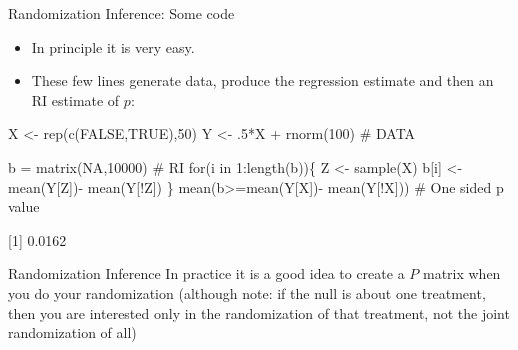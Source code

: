 \documentclass[
  11pt,
  ignorenonframetext,
]{beamer}
\newenvironment{Shaded}{\begin{snugshade}}{\end{snugshade}}
\newcommand{\CommentTok}[1]{\textcolor[rgb]{0.37,0.37,0.37}{#1}}
\newcommand{\ConstantTok}[1]{\textcolor[rgb]{0.56,0.35,0.01}{#1}}
\newcommand{\ControlFlowTok}[1]{\textcolor[rgb]{0.00,0.23,0.31}{#1}}
\newcommand{\DecValTok}[1]{\textcolor[rgb]{0.68,0.00,0.00}{#1}}
\newcommand{\FunctionTok}[1]{\textcolor[rgb]{0.28,0.35,0.67}{#1}}
\newcommand{\NormalTok}[1]{\textcolor[rgb]{0.00,0.23,0.31}{#1}}
\newcommand{\OtherTok}[1]{\textcolor[rgb]{0.00,0.23,0.31}{#1}}
\newcommand{\SpecialCharTok}[1]{\textcolor[rgb]{0.37,0.37,0.37}{#1}}
\providecommand{\tightlist}{%
  \setlength{\itemsep}{0pt}\setlength{\parskip}{0pt}}\usepackage{longtable,booktabs,array}
\begin{document}
\begin{frame}[fragile]{Randomization Inference: Some code}
\protect\hypertarget{randomization-inference-some-code}{}
\begin{itemize}
\tightlist
\item
  In principle it is very easy.
\item
  These few lines generate data, produce the regression estimate and
  then an RI estimate of \(p\):
\end{itemize}

\begin{Shaded}
\begin{Highlighting}[]
\NormalTok{X }\OtherTok{\textless{}{-}} \FunctionTok{rep}\NormalTok{(}\FunctionTok{c}\NormalTok{(}\ConstantTok{FALSE}\NormalTok{,}\ConstantTok{TRUE}\NormalTok{),}\DecValTok{50}\NormalTok{)}
\NormalTok{Y }\OtherTok{\textless{}{-}}\NormalTok{ .}\DecValTok{5}\SpecialCharTok{*}\NormalTok{X }\SpecialCharTok{+} \FunctionTok{rnorm}\NormalTok{(}\DecValTok{100}\NormalTok{)             }\CommentTok{\# DATA}

\NormalTok{b }\OtherTok{=} \FunctionTok{matrix}\NormalTok{(}\ConstantTok{NA}\NormalTok{,}\DecValTok{10000}\NormalTok{)               }\CommentTok{\# RI}
\ControlFlowTok{for}\NormalTok{(i }\ControlFlowTok{in} \DecValTok{1}\SpecialCharTok{:}\FunctionTok{length}\NormalTok{(b))\{}
\NormalTok{     Z    }\OtherTok{\textless{}{-}} \FunctionTok{sample}\NormalTok{(X)}
\NormalTok{     b[i] }\OtherTok{\textless{}{-}} \FunctionTok{mean}\NormalTok{(Y[Z])}\SpecialCharTok{{-}} \FunctionTok{mean}\NormalTok{(Y[}\SpecialCharTok{!}\NormalTok{Z])}
\NormalTok{     \}}
\FunctionTok{mean}\NormalTok{(b}\SpecialCharTok{\textgreater{}=}\FunctionTok{mean}\NormalTok{(Y[X])}\SpecialCharTok{{-}} \FunctionTok{mean}\NormalTok{(Y[}\SpecialCharTok{!}\NormalTok{X]))   }\CommentTok{\# One sided p value}
\end{Highlighting}
\end{Shaded}

{[}1{]} 0.0162
\end{frame}

\begin{frame}{Randomization Inference}
\protect\hypertarget{randomization-inference-2}{}
In practice it is a good idea to create a \(P\) matrix when you do your
randomization (although note: if the null is about one treatment, then
you are interested only in the randomization of that treatment, not the
joint randomization of all)
\end{frame}
\end{document}
